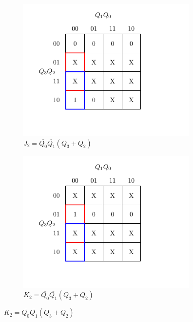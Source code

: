 \documentclass[a4paper,12pt]{article}
\begin{document}
\newpage
\begin{figure}[H]
    \centering

    \begin{subfigure}[b]{0.45\textwidth}
        \centering
        \includegraphics[width=\linewidth]{dec/dj2.png}
        \caption{$J_2=\overline{Q_0}\overline{Q_1}(Q_3+Q_2)$}
    \end{subfigure}
    \hfill
    \begin{subfigure}[b]{0.45\textwidth}
        \centering
        \includegraphics[width=\linewidth]{dec/dk2.png}
        \caption{$K_2=\overline{Q_0}\overline{Q_1}(Q_3+Q_2)$}
    \end{subfigure}


\end{figure}
\end{document}
